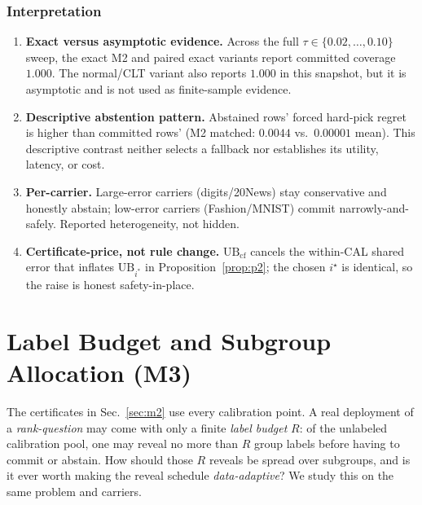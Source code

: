 \documentclass{article}
\begin{document}
\subsubsection{Interpretation}
\begin{enumerate}
\item \textbf{Exact versus asymptotic evidence.} Across the full $\tau\in\{0.02,\dots,0.10\}$
sweep, the exact M2 and paired exact variants report committed coverage $1.000$. The
normal/CLT variant also reports $1.000$ in this snapshot, but it is asymptotic and is not used
as finite-sample evidence.
\item \textbf{Descriptive abstention pattern.} Abstained rows' forced hard-pick regret is
higher than committed rows' (M2 matched: $0.0044$ vs.\ $0.00001$ mean). This descriptive
contrast neither selects a fallback nor establishes its utility, latency, or cost.
\item \textbf{Per-carrier.} Large-error carriers (digits/20News) stay conservative and
honestly abstain; low-error carriers (Fashion/MNIST) commit narrowly-and-safely. Reported
heterogeneity, not hidden.
\item \textbf{Certificate-price, not rule change.} $\mathrm{UB}_{\mathrm{cf}}$ cancels the
within-CAL shared error that inflates $\mathrm{UB}_{i^*}$ in Proposition~\ref{prop:p2}; the
chosen $i^\star$ is identical, so the raise is honest safety-in-place.
\end{enumerate}

\section{Label Budget and Subgroup Allocation (M3)}
\label{sec:m3}

The certificates in Sec.~\ref{sec:m2} use every calibration point. A real deployment of a
\emph{rank-question} may come with only a finite \emph{label budget} $R$: of the unlabeled
calibration pool, one may reveal no more than $R$ group labels before having to commit or
abstain. How should those $R$ reveals be spread over subgroups, and is it ever worth making
the reveal schedule \emph{data-adaptive}? We study this on the same problem and carriers.
\end{document}
